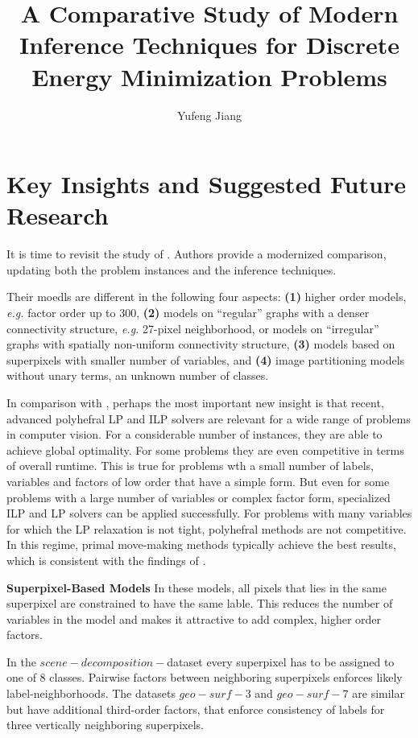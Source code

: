 \documentclass[10pt,twocolumn,letterpaper]{article}
\begin{document}
\title{A Comparative Study of Modern Inference Techniques for Discrete Energy Minimization Problems}
\author{Yufeng Jiang}
\maketitle
\balance

\section{Key Insights and Suggested Future Research}

It is time to revisit the study of \cite{A}. Authors provide a modernized comparison, updating both the problem instances and the inference techniques.

Their moedls are different in the following four aspects: {\bf (1)} higher order models, \emph{e.g.} factor order up to 300, {\bf (2)} models on ``regular'' graphs with a denser connectivity structure, \emph{e.g.} 27-pixel neighborhood, or models on ``irregular'' graphs with spatially non-uniform connectivity structure, {\bf (3)} models based on superpixels with smaller number of variables, and {\bf (4)} image partitioning models without unary terms, an unknown number of classes.

In comparison with \cite{A}, perhaps the most important new insight is that recent, advanced polyhefral LP and ILP solvers are relevant for a wide range of problems in computer vision. For a considerable number of instances, they are able to achieve global optimality. For some problems they are even competitive in terms of overall runtime. This is true for problems wth a small number of labels, variables and factors of low order that have a simple form. But even for some problems with a large number of variables or complex factor form, specialized ILP and LP solvers can be applied successfully. For problems with many variables for which the LP relaxation is not tight, polyhefral methods are not competitive. In this regime, primal move-making methods typically achieve the best results, which is consistent with the findings of \cite{A}.

{\bf Superpixel-Based Models} In these models, all pixels that lies in the same superpixel are constrained to have the same lable. This reduces the number of variables in the model and makes it attractive to add complex, higher order factors.

In the $scene-decomposition-$dataset \cite{Decomposing} every superpixel has to be assigned to one of 8 classes. Pairwise factors between neighboring superpixels enforces likely label-neighborhoods. The datasets $geo-surf-3$ and $geo-surf-7$\cite{Inference,Recovering} are similar but have additional third-order factors, that enforce consistency of labels for three vertically neighboring superpixels.
\end{document}
